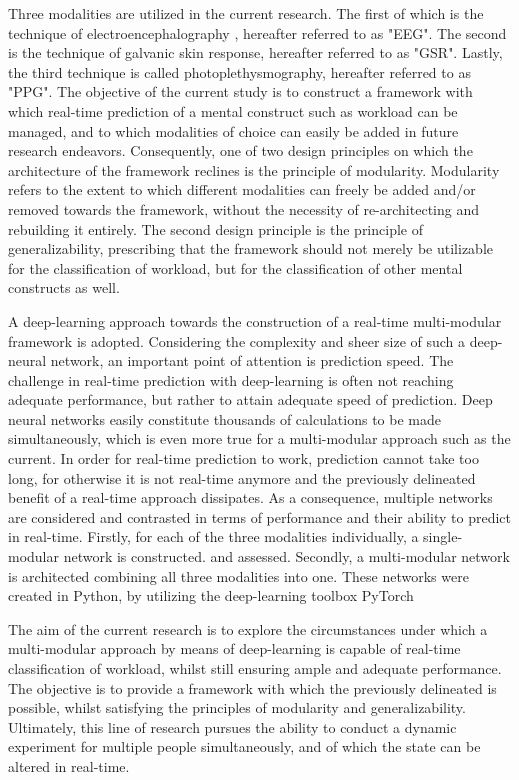 \documentclass[12pt]{article}
\begin{document}
Three modalities are utilized in the current research. The first of which is the technique of electroencephalography
, hereafter referred to as "EEG". The second is the technique of galvanic skin response, hereafter referred to as "GSR". Lastly, the third technique is called photoplethysmography, hereafter referred to as "PPG". The objective of the current study is to construct a framework with which real-time prediction of a mental construct such as workload can be managed, and to which modalities of choice can easily be added in future research endeavors. Consequently, one of two design principles on which the architecture of the framework reclines is the principle of modularity. Modularity refers to the extent to which different modalities can freely be added and/or removed towards the framework, without the necessity of re-architecting and rebuilding it entirely. The second design principle is the principle of generalizability, prescribing that the framework should not merely be utilizable for the classification of workload, but for the classification of other mental constructs as well. 

A deep-learning approach towards the construction of a real-time multi-modular framework is adopted. Considering the complexity and sheer size of such a deep-neural network, an important point of attention is prediction speed. The challenge in real-time prediction with deep-learning is often not reaching adequate performance, but rather to attain adequate speed of prediction. Deep neural networks easily constitute thousands of calculations to be made simultaneously, which is even more true for a multi-modular approach such as the current. In order for real-time prediction to work, prediction cannot take too long, for otherwise it is not real-time anymore and the previously delineated benefit of a real-time approach dissipates. As a consequence, multiple networks are considered and contrasted in terms of performance and their ability to predict in real-time. Firstly, for each of the three modalities individually, a single-modular network is constructed. and assessed.  Secondly, a multi-modular network is architected combining all three modalities into one. These networks were created in Python, by utilizing the deep-learning toolbox PyTorch \cite{paszke2017automatic}


The aim of the current research is to explore the circumstances under which a multi-modular approach by means of deep-learning is capable of real-time classification of workload, whilst still ensuring ample and adequate performance. The objective is to provide a framework with which the previously delineated is possible, whilst satisfying the principles of modularity and generalizability. Ultimately, this line of research pursues the ability to conduct a dynamic experiment for multiple people simultaneously, and of which the state can be altered in real-time. 
\end{document}
